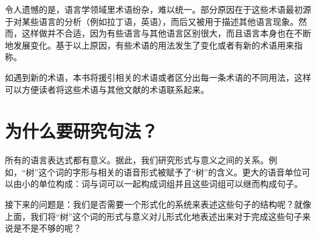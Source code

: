 令人遗憾的是，语言学领域里术语纷杂，难以统一。部分原因在于这些术语最初源于对某些语言的分析（例如拉丁语，英语），而后又被用于描述其他语言现象。然而，这样做并不合适，因为有些语言与其他语言区别很大，而且语言本身也在不断地发展变化。基于以上原因，有些术语的用法发生了变化或者有新的术语用来指称。

如遇到新的术语，本书将援引相关的术语或者区分出每一条术语的不同用法，这样可以方便读者将这些术语与其他文献的术语联系起来。


\section{为什么要研究句法？}
\label{sec-wozu-syntax}

所有的语言表达式都有意义。据此，我们研究形式与意义之间的关系\citep{Saussure16a}\nocite{Saussure16a-Fr}。例如，“树”这个词的字形与相关的语音形式被赋予了“树”的含义。更大的语音单位可以由小的单位构成：词与词可以一起构成词组并且这些词组可以继而构成句子。

接下来的问题是：我们是否需要一个形式化的系统来表述这些句子的结构呢？就像上面，我们将“树”这个词的形式与意义对儿形式化地表述出来对于完成这些句子来说是不是不够的呢？

